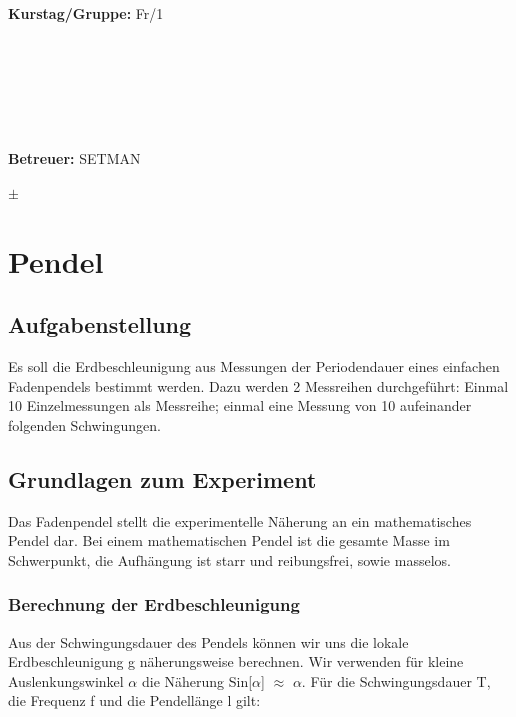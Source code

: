 \documentclass{article}
\begin{document}
\begin{verbatim}


\end{verbatim}
			\begin{flushleft}
			\textbf{\Large{Kurstag/Gruppe:}} \Large{Fr/1}
			\end{flushleft}

\begin{verbatim}






\end{verbatim}
			\begin{flushleft}
			\LARGE{\textbf{Betreuer:}}	\Large{SETMAN}	
			\end{flushleft}
$\pm$
\section{Pendel}	
\subsection{Aufgabenstellung}
Es soll die Erdbeschleunigung aus Messungen der Periodendauer eines einfachen Fadenpendels bestimmt werden. Dazu werden 2 Messreihen durchgeführt: Einmal 10 Einzelmessungen als Messreihe; einmal eine Messung von 10 aufeinander folgenden Schwingungen.
\subsection{Grundlagen zum Experiment}
Das Fadenpendel stellt die experimentelle Näherung an ein mathematisches Pendel dar. Bei einem mathematischen Pendel ist die gesamte Masse im Schwerpunkt, die Aufhängung ist starr und reibungsfrei, sowie masselos.
\subsubsection*{Berechnung der Erdbeschleunigung}
Aus der Schwingungsdauer des Pendels können wir uns die lokale Erdbeschleunigung g näherungsweise berechnen. Wir verwenden für kleine Auslenkungswinkel $\alpha$ die Näherung Sin[$\alpha$] $\approx$ $\alpha$. 
Für die Schwingungsdauer T, die Frequenz f und die Pendellänge l gilt:
\end{document}
